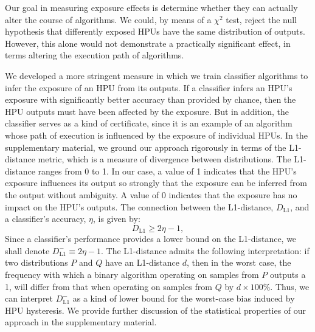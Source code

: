 \documentclass[12pt]{article}
\begin{document}
Our goal in measuring exposure effects is determine whether they can actually 
alter the course of algorithms.
We could, by means of a $\chi^2$ test, reject the null hypothesis that
differently exposed HPUs have the same distribution of outputs.
However, this alone would not demonstrate a practically significant effect, in 
terms altering the execution path of algorithms.

We developed a more stringent measure in which we train classifier algorithms 
to infer the exposure of an HPU from its outputs.
If a classifier infers an HPU's exposure with significantly 
better accuracy than provided by chance, then the HPU outputs must have 
been affected by the exposure.  
But in addition, the classifier serves as a kind of certificate, since it is 
an example of an algorithm whose path of execution is influenced by the 
exposure of 
individual HPUs.  In the supplementary material, we ground our approach 
rigorously in terms of the L1-distance metric, which is a measure of 
divergence between distributions.  The L1-distance ranges from 
0 to 1.  In our case, a value of 1 indicates that the HPU's exposure
influences its output so strongly that the exposure can be inferred from the
output without ambiguity.  A value of 0 indicates that the exposure has no
impact on the HPU's outputs.  The connection between the
L1-distance, $D_\mathrm{L1}$, and a classifier's accuracy, $\eta$, is given by:
\begin{equation}
	D_\mathrm{L1} \geq 2 \eta - 1, 
	\label{l1}
\end{equation}
Since a classifier's performance provides a lower bound on the L1-distance, 
we shall denote $D_\mathrm{L1}^-\equiv 2\eta-1$.
The L1-distance admits the following interpretation: if two distributions
$P$ and $Q$ have an L1-distance $d$, then in the worst case, the 
frequency with which a binary algorithm operating on samples
from $P$ outputs a 1, will differ from that when operating on samples from 
$Q$ by $d \times 100\%$.  
Thus, we can interpret $D_\mathrm{L1}^-$ as a kind of
lower bound for the worst-case bias induced by HPU hysteresis.
We provide further discussion of the statistical properties of our approach 
in the supplementary material.
\end{document}
